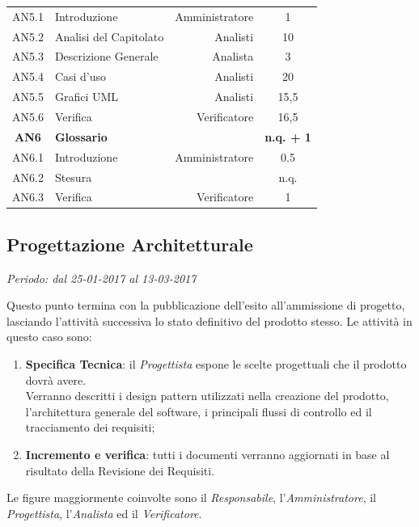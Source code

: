 \documentclass[12pt,a4paper,titlepage]{article}
\begin{document}
{{\begin{tabular}{|c|l|r|c|}
				AN5.1 & Introduzione & Amministratore & 1 \\
				
				AN5.2 & Analisi del Capitolato & Analisti & 10 \\
				
				AN5.3 & Descrizione Generale & Analista & 3 \\
				
				AN5.4 & Casi d'uso & Analisti & 20 \\
				
				AN5.5 & Grafici UML & Analisti & 15,5 \\
				
				AN5.6 & Verifica & Verificatore & 16,5 \\
				\hline
				\textbf{AN6} & \textbf{Glossario} & & \textbf{n.q. + 1} \\
				
				AN6.1 & Introduzione & Amministratore & 0.5 \\
				 
				AN6.2 & Stesura & & n.q. \\
						
				AN6.3 & Verifica & Verificatore & 1 \\
				\hline	
			\end{tabular}
		}
		\normalsize
	}
	
	\subsection{Progettazione Architetturale}
	\begin{center}\textit{Periodo: dal 25-01-2017 al 13-03-2017}\end{center}
	Questo punto termina con la pubblicazione dell'esito all'ammissione di progetto, lasciando l'attività successiva lo stato definitivo del prodotto stesso. Le attività in questo caso sono:
	\begin{enumerate}
		\item \textbf{Specifica Tecnica}: il \textit{Progettista} espone le scelte progettuali che il prodotto dovrà avere.\\
		Verranno descritti i design pattern utilizzati nella creazione del prodotto, l'architettura generale del software, i principali flussi di controllo ed il tracciamento dei requisiti;
		\item \textbf{Incremento e verifica}: tutti i documenti verranno aggiornati in base al risultato della Revisione dei Requisiti.
	\end{enumerate}
	Le figure maggiormente coinvolte sono il \textit{Responsabile}, l'\textit{Amministratore}, il \textit{Progettista}, l'\textit{Analista}
	ed il \textit{Verificatore}. \\
	
\end{document}
